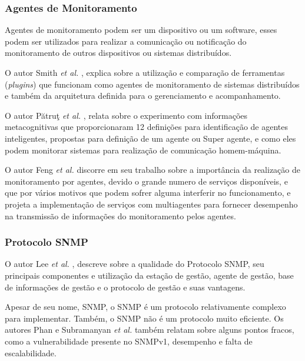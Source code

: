 \subsubsection{Agentes de Monitoramento}

Agentes de monitoramento podem ser um dispositivo ou um software, esses podem ser utilizados para realizar a comunicação ou notificação do monitoramento de outros dispositivos ou sistemas distribuídos. 

O autor Smith \textit{et al.} \cite{smith2008flexible}, explica sobre a utilização e comparação de ferramentas (\textit{plugins}) que funcionam como agentes de monitoramento de sistemas distribuídos e também da arquitetura definida para o gerenciamento e acompanhamento. 

O autor Pătruţ \textit{et al.} \cite{puatruct2010agent}, relata sobre o experimento com informações metacognitivas que proporcionaram 12 definições para identificação de agentes inteligentes, propostas para definição de um agente ou Super agente, e como eles podem monitorar sistemas para realização de comunicação homem-máquina.

O autor Feng \textit{et al.} \cite{feng2002distributed} discorre em seu trabalho sobre a importância da realização de monitoramento por agentes, devido o grande numero de serviços disponíveis, e que por vários motivos que podem sofrer alguma interferir no funcionamento, e projeta a implementação de serviços com multiagentes para fornecer desempenho na transmissão de informações do monitoramento pelos agentes.

\subsubsection{Protocolo SNMP}
\label{snmpDescription}

O autor Lee \textit{et al.} \cite{lee2004design}, descreve sobre a qualidade do Protocolo \acrshort{SNMP}, seu principais componentes e utilização da estação de gestão, agente de gestão, base de informações de gestão e o protocolo de gestão e suas vantagens. 

Apesar  de  seu  nome,  \acrlong{SNMP},  o  \acrshort{SNMP}  é  um protocolo  relativamente  complexo  para  implementar.  Também,  o  \acrshort{SNMP}  não  é  um protocolo muito eficiente. Os autores Phan e Subramanyan \textit{et al.} \cite{phan2009cryptanalysis,subramanyan2000scalable} também relatam sobre alguns pontos fracos, como a vulnerabilidade presente no SNMPv1, desempenho e falta de escalabilidade.

